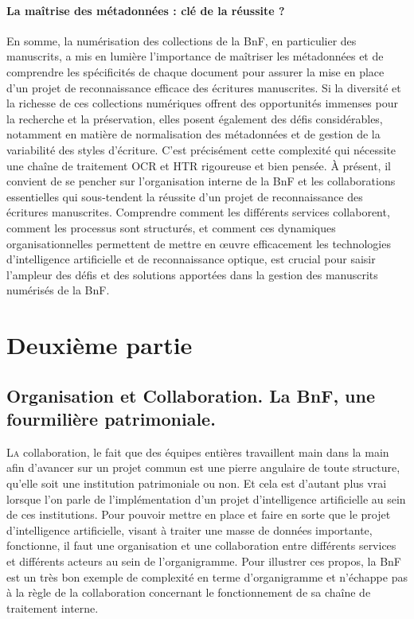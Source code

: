 \documentclass[a4paper,12pt,twoside]{book}
\begin{document}
	\subsection{La maîtrise des métadonnées : clé de la réussite ?}
	En somme, la numérisation des collections de la BnF, en particulier des manuscrits, a mis en lumière l’importance de maîtriser les métadonnées et de comprendre les spécificités de chaque document pour assurer la mise en place d’un projet de reconnaissance efficace des écritures manuscrites. Si la diversité et la richesse de ces collections numériques offrent des opportunités immenses pour la recherche et la préservation, elles posent également des défis considérables, notamment en matière de normalisation des métadonnées et de gestion de la variabilité des styles d’écriture. C’est précisément cette complexité qui nécessite une chaîne de traitement OCR et HTR rigoureuse et bien pensée. À présent, il convient de se pencher sur l’organisation interne de la BnF et les collaborations essentielles qui sous-tendent la réussite d’un projet de reconnaissance des écritures manuscrites. Comprendre comment les différents services collaborent, comment les processus sont structurés, et comment ces dynamiques organisationnelles permettent de mettre en œuvre efficacement les technologies d’intelligence artificielle et de reconnaissance optique, est crucial pour saisir l’ampleur des défis et des solutions apportées dans la gestion des manuscrits numérisés de la BnF.
	
	\part{Deuxième partie}
	\chapter{Organisation et Collaboration.
		La BnF, une fourmilière patrimoniale.}
	
	\lettrine{L}a collaboration, le fait que des équipes entières travaillent main dans la main afin d’avancer sur un projet commun est une pierre angulaire de toute structure, qu’elle soit une institution patrimoniale ou non. Et cela est d’autant plus vrai lorsque l’on parle de l’implémentation d’un projet d’intelligence artificielle au sein de ces institutions. Pour pouvoir mettre en place et faire en sorte que le projet d’intelligence artificielle, visant à traiter une masse de données importante, fonctionne, il faut une organisation et une collaboration entre différents services et différents acteurs au sein de l’organigramme. Pour illustrer ces propos, la BnF est un très bon exemple de complexité en terme d’organigramme et n’échappe pas à la règle de la collaboration concernant le fonctionnement de sa chaîne de traitement interne. 
	
\end{document}
